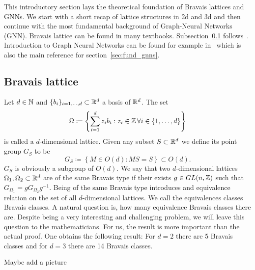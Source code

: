 This introductory section lays the theoretical foundation of Bravais lattices and GNNs. 
We start with a short recap of lattice structures in 2d and 3d and then continue with 
the most fundamental background of Graph-Neural Networks (GNN). 
Bravais lattice can be found in many textbooks. Subsection~\ref{sec:brav_latt} follows~\cite{symGroupsApplications}.
Introduction to Graph Neural Networks can be found for example in~\cite{zw} which is also the main reference for section~\ref{sec:fund_gnns}.

\subsection{Bravais lattice}
\label{sec:brav_latt}
Let $d\in\mathbb{N}$ and $\{b_i\}_{i=1,\dots,d}\subset \mathbb{R}^d$ a basis of $\mathbb{R}^d$. The set 
\begin{equation*}
    \Omega\coloneq\left\{\sum_{i=1}^{d}z_i b_i: z_i\in\mathbb{Z}\,\forall i\in\{1,\dots,d\}\right\}
\end{equation*}
is called a $d$-dimensional lattice. Given any subset $S\subset\mathbb{R}^d$ we define its point group $G_S$ to be
\begin{equation*}
    G_S\coloneq \left\{M\in O(d) : MS=S\right\}\subset O(d).
\end{equation*}
$G_S$ is obviously a subgroup of $O(d)$. We say that two $d$-dimensional lattices $\Omega_1, \Omega_2\subset \mathbb{R}^d$ are of the same Bravais type if
their exists $g\in GL(n,\mathbb{Z})$ such that $G_{\Omega_1}=g G_{\Omega_2} g^{-1}$. 
Being of the same Bravais type introduces and equivalence relation on the set of all $d$-dimensional lattices. We call the equivalences classes Bravais classes.
A natural question is, how many equivalence Bravais classes there are. Despite being a very interesting and challenging problem,
we will leave this question to the mathematicians. For us, the result is more important than the actual proof. One obtains the following result:
For $d=2$ there are 5 Bravais classes and for $d=3$ there are 14 Bravais classes. 

Maybe add a picture

